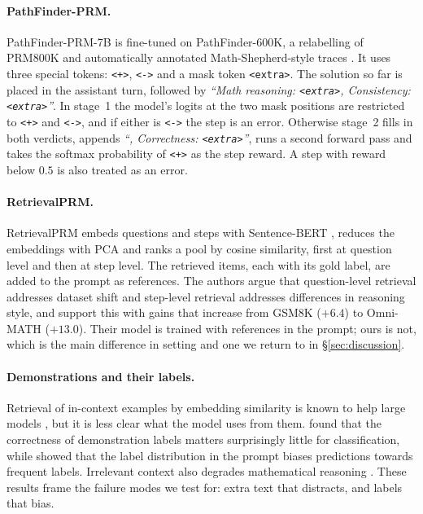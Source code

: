 \documentclass[11pt]{article}
\newcommand{\pos}{\texttt{<+>}}
\newcommand{\negt}{\texttt{<->}}
\newcommand{\extra}{\texttt{<extra>}}
\begin{document}
\paragraph{PathFinder-PRM.} PathFinder-PRM-7B \citep{pala2025pathfinder} is fine-tuned on
PathFinder-600K, a relabelling of PRM800K \citep{lightman2024verify} and automatically annotated
Math-Shepherd-style traces \citep{wang2024mathshepherd}. It uses three special tokens: \pos,
\negt{} and a mask token \extra. The solution so far is placed in the assistant turn, followed
by \textit{``Math reasoning: \extra, Consistency: \extra''}. In stage~1 the model's logits at the
two mask positions are restricted to \pos{} and \negt, and if either is \negt{} the step is
an error. Otherwise stage~2 fills in both verdicts, appends \textit{``, Correctness: \extra''},
runs a second forward pass and takes the softmax probability of \pos{} as the step reward. A
step with reward below $0.5$ is also treated as an error.

\paragraph{RetrievalPRM.} RetrievalPRM \citep{zhu2025retrievalprm} embeds questions and steps
with Sentence-BERT \citep{reimers2019sbert}, reduces the embeddings with PCA and ranks a pool by
cosine similarity, first at question level and then at step level. The retrieved items, each
with its gold label, are added to the prompt as references. The authors argue that question-level
retrieval addresses dataset shift and step-level retrieval addresses differences in reasoning
style, and support this with gains that increase from GSM8K ($+6.4$) to Omni-MATH ($+13.0$).
Their model is trained with references in the prompt; ours is not, which is the main
difference in setting and one we return to in \S\ref{sec:discussion}.

\paragraph{Demonstrations and their labels.} Retrieval of in-context examples by embedding
similarity is known to help large models \citep{liu2022makes}, but it is less clear what the
model uses from them. \citet{min2022rethinking} found that the correctness of demonstration labels
matters surprisingly little for classification, while \citet{zhao2021calibrate} showed that the
label distribution in the prompt biases predictions towards frequent labels. Irrelevant context
also degrades mathematical reasoning \citep{shi2023distracted}. These results frame the failure
modes we test for: extra text that distracts, and labels that bias.
\end{document}
